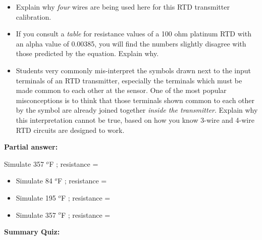 \begin{itemize}
\item{} Explain why {\it four} wires are being used here for this RTD transmitter calibration.
\item{} If you consult a {\it table} for resistance values of a 100 ohm platinum RTD with an alpha value of 0.00385, you will find the numbers slightly disagree with those predicted by the equation.  Explain why.
\item{} Students very commonly mis-interpret the symbols drawn next to the input terminals of an RTD transmitter, especially the terminals which must be made common to each other at the sensor.  One of the most popular misconceptions  is to think that those terminals shown common to each other by the symbol are already joined together {\it inside the transmitter}.  Explain why this interpretation cannot be true, based on how you know 3-wire and 4-wire RTD circuits are designed to work.
\end{itemize}







\noindent
{\bf Partial answer:}

\vskip 10pt

Simulate 357 $^{o}$F ; resistance =  \hskip 10pt  







\begin{itemize}
\item{} Simulate 84 $^{o}$F ; resistance =  \hskip 10pt 
\vskip 10pt
\item{} Simulate 195 $^{o}$F ; resistance =  \hskip 10pt 
\vskip 10pt
\item{} Simulate 357 $^{o}$F ; resistance =  \hskip 10pt  
\end{itemize}

\vfil \eject

\noindent
{\bf Summary Quiz:}

